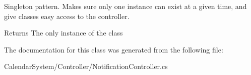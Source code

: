 Singleton pattern. Makes sure only one instance can exist at a given time, and give classes easy access to the controller. 

\begin{DoxyReturn}{Returns}
The only instance of the class
\end{DoxyReturn}


The documentation for this class was generated from the following file\+:\begin{DoxyCompactItemize}
\item 
Calendar\+System/\+Controller/Notification\+Controller.\+cs\end{DoxyCompactItemize}
